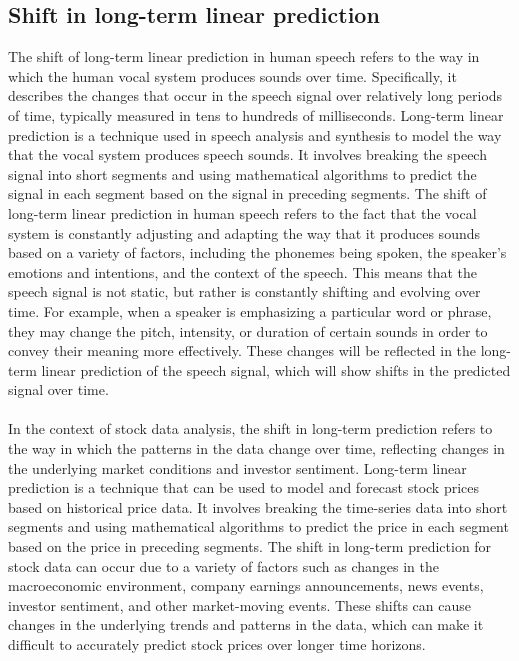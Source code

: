 \subsection{Shift in long-term linear prediction} \label{subsec:shiftlp}
The shift of long-term linear prediction in human speech refers to the way in which the human vocal system produces
sounds over time.
Specifically, it describes the changes that occur in the speech signal over relatively long periods of time, typically
measured in tens to hundreds of milliseconds. Long-term linear prediction is a technique used in speech analysis and
synthesis to model the way that the vocal system produces speech sounds. It involves breaking the speech signal into
short segments and using mathematical algorithms to predict the signal in each segment based on the signal in preceding
segments. The shift of long-term linear prediction in human speech refers to the fact that the vocal system is constantly
adjusting and adapting the way that it produces sounds based on a variety of factors, including the phonemes being spoken,
the speaker's emotions and intentions, and the context of the speech. This means that the speech signal is not static,
but rather is constantly shifting and evolving over time. For example, when a speaker is emphasizing a particular
word or phrase, they may change the pitch, intensity, or duration of certain sounds in order to convey their meaning
more effectively. These changes will be reflected in the long-term linear prediction of the speech signal, which will
show shifts in the predicted signal over time.\\
\\
In the context of stock data analysis, the shift in long-term prediction refers to the way in which the patterns in
the data change over time, reflecting changes in the underlying market conditions and investor sentiment.
Long-term linear prediction is a technique that can be used to model and forecast stock prices based on historical
price data. It involves breaking the time-series data into short segments and using mathematical algorithms to predict
the price in each segment based on the price in preceding segments. The shift in long-term prediction for stock data
can occur due to a variety of factors such as changes in the macroeconomic environment, company earnings announcements,
news events, investor sentiment, and other market-moving events. These shifts can cause changes in the underlying trends
and patterns in the data, which can make it difficult to accurately predict stock prices over longer time horizons.
